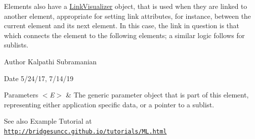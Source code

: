 Elements also have a \hyperlink{classbridges_1_1base_1_1_link_visualizer}{Link\+Visualizer} object, that is used when they are linked to another element, appropriate for setting link attributes, for instance, between the current element and its next element. In this case, the link in question is that which connects the element to the following elements; a similar logic follows for sublists.

\begin{DoxyAuthor}{Author}
Kalpathi Subramanian
\end{DoxyAuthor}
\begin{DoxyDate}{Date}
5/24/17, 7/14/19
\end{DoxyDate}

\begin{DoxyParams}{Parameters}
{\em $<$\+E$>$} & The generic parameter object that is part of this element, representing either application specific data, or a pointer to a sublist.\\
\hline
\end{DoxyParams}
\begin{DoxySeeAlso}{See also}
Example Tutorial at \href{http://bridgesuncc.github.io/tutorials/ML.html}{\tt http\+://bridgesuncc.\+github.\+io/tutorials/\+M\+L.\+html} 
\end{DoxySeeAlso}
